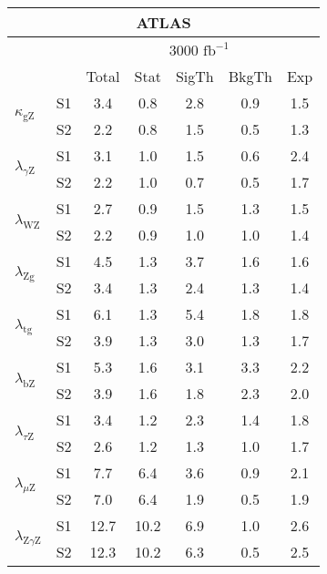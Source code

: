 \begin{tabular}{@{} l c c@{\hskip 0.15in} c c c c @{}}
  \hline
     \multicolumn{7}{c}{ATLAS}\\
 \hline
  &  & \multicolumn{5}{c}{3000 $\text{fb}^{-1}$} \\
  &  & Total & Stat & SigTh & BkgTh & Exp \\
  \hline
  \multirow{2}{*}{$\kappa_{\mathrm{gZ}}$} & S1 & 3.4   & 0.8   & 2.8   & 0.9   & 1.5  \\[1pt] 
  & S2 & 2.2   & 0.8   & 1.5   & 0.5   & 1.3  \\[4pt]  
  \multirow{2}{*}{$\lambda_{\gamma\mathrm{Z}}$} & S1 & 3.1   & 1.0   & 1.5   & 0.6   & 2.4  \\[1pt]
  & S2  & 2.2   & 1.0   & 0.7   & 0.5   & 1.7  \\[4pt]
  \multirow{2}{*}{$\lambda_{\mathrm{WZ}}$} & S1 & 2.7   & 0.9   & 1.5   & 1.3   & 1.5  \\[1pt]
  & S2  & 2.2   & 0.9   & 1.0   & 1.0   & 1.4  \\[4pt]
  \multirow{2}{*}{$\lambda_{\mathrm{Zg}}$} & S1 & 4.5   & 1.3   & 3.7   & 1.6   & 1.6  \\[1pt]
  & S2  & 3.4   & 1.3   & 2.4   & 1.3   & 1.4  \\[4pt]
  \multirow{2}{*}{$\lambda_{\mathrm{tg}}$} & S1 & 6.1   & 1.3   & 5.4   & 1.8   & 1.8  \\[1pt]
  & S2  & 3.9   & 1.3   & 3.0   & 1.3   & 1.7  \\[4pt]
  \multirow{2}{*}{$\lambda_{\mathrm{bZ}}$} & S1 & 5.3   & 1.6   & 3.1   & 3.3   & 2.2  \\[1pt]
  & S2  & 3.9   & 1.6   & 1.8   & 2.3   & 2.0  \\[4pt]
  \multirow{2}{*}{$\lambda_{\tau\mathrm{Z}}$} & S1 & 3.4   & 1.2   & 2.3   & 1.4   & 1.8  \\[1pt]
  & S2  & 2.6   & 1.2   & 1.3   & 1.0   & 1.7  \\[4pt]
  \multirow{2}{*}{$\lambda_{\mu\mathrm{Z}}$} & S1 & 7.7   & 6.4   & 3.6   & 0.9   & 2.1  \\[1pt]
  & S2  & 7.0   & 6.4   & 1.9   & 0.5   & 1.9  \\[4pt]
  \multirow{2}{*}{$\lambda_{\mathrm{Z}\gamma\mathrm{Z}}$} & S1 & 12.7  & 10.2  & 6.9   & 1.0   & 2.6  \\[1pt]
  & S2  & 12.3  & 10.2  & 6.3   & 0.5   & 2.5  \\[4pt]
  \hline
\end{tabular}
